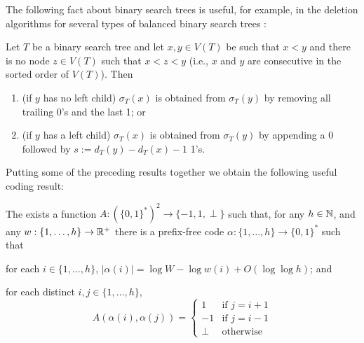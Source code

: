 \documentclass[kpfonts]{patmorin}
\begin{document}
The following fact about binary search trees is useful, for example, in the deletion algorithms for several types of balanced binary search trees \cite[Section~6.2.3]{morin:open}:

\begin{lem}
  Let $T$ be a binary search tree and let $x,y\in V(T)$ be such that $x<y$ and there is no node $z\in V(T)$ such that $x<z<y$ (i.e., $x$ and $y$ are consecutive in the sorted order of $V(T)$).  Then
  \begin{enumerate}
    \item (if $y$ has no left child) $\sigma_T(x)$ is obtained from $\sigma_T(y)$ by removing all trailing 0's and the last 1; or
    \item (if $y$ has a left child) $\sigma_T(x)$ is obtained from $\sigma_T(y)$ by appending a 0 followed by $s:=d_T(y)-d_T(x)-1$ 1's.
  \end{enumerate}
\end{lem}

Putting some of the preceding results together we obtain the following useful coding result:

\begin{lem}
  The exists a function $A:(\{0,1\}^*)^2\to\{-1,1,\perp\}$ such that, for any $h\in\mathbb{N}$, and any $w:\{1,\ldots,h\}\to\mathbb{R}^+$ there is a prefix-free code $\alpha:\{1,\ldots,h\}\to \{0,1\}^*$ such that 
  \begin{compactenum}
    \item for each $i\in\{1,\ldots,h\}$, $|\alpha(i)|=\log W -\log w(i) + O(\log\log h)$; and
    \item for each distinct $i,j\in\{1,\ldots,h\}$, 
    \[   A(\alpha(i),\alpha(j)) 
    = \begin{cases}
       1 & \text{if $j=i+1$} \\
       -1 & \text{if $j=i-1$} \\
       \perp & \text{otherwise}
      \end{cases}
      \]
    \end{compactenum}
\end{lem}
\end{document}
